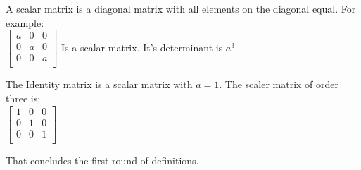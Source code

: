 \begin{definition}
    A scalar matrix is a diagonal matrix with all elements on the diagonal equal. For example:\\
    $\begin{bmatrix}
        a & 0 & 0 \\
        0 & a & 0\\
        0 & 0 & a\\
    \end{bmatrix}$
    Is a scalar matrix. It's determinant is $a^3$
\end{definition}
\begin{definition}
    The Identity matrix is a scalar matrix with $a=1$. The scaler matrix of order three is:\\
    $\begin{bmatrix}
        1 & 0 & 0 \\
        0 & 1 & 0\\
        0 & 0 & 1\\
    \end{bmatrix}$
\end{definition}
That concludes the first round of definitions.\\
